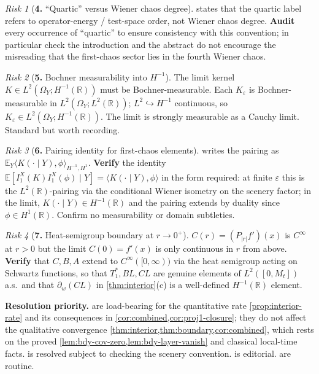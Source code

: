 \documentclass[11pt,reqno]{amsart}
\theoremstyle{plain}
\theoremstyle{definition}
\theoremstyle{remark}
\newtheorem*{risk}{Risk}
\newcommand{\R}{\mathbb{R}}
\newcommand{\E}{\mathbb{E}}
\begin{document}
\begin{risk}[\textbf{4.} ``Quartic'' versus Wiener chaos degree]
\label{rsk:quartic-label}
 states that the quartic label refers
to operator-energy / test-space order, not Wiener chaos degree.
\textbf{Audit} every occurrence of ``quartic'' to ensure consistency
with this convention; in particular check the introduction and the
abstract do not encourage the misreading that the first-chaos
sector lies in the fourth Wiener chaos.
\end{risk}

\begin{risk}[\textbf{5.} Bochner measurability into
\texorpdfstring{$H^{-1}$}{H\textasciicircum-1}]
\label{rsk:bochner}
The limit kernel $K\in L^{2}(\Omega_{Y};H^{-1}(\R))$ must be
Bochner-measurable. Each $K_{\varepsilon}$ is Bochner-measurable in
$L^{2}(\Omega_{Y};L^{2}(\R))$; $L^{2}\hookrightarrow H^{-1}$
continuous, so $K_{\varepsilon}\in L^{2}(\Omega_{Y};H^{-1}(\R))$.
The limit is strongly measurable as a Cauchy limit. Standard but
worth recording.
\end{risk}

\begin{risk}[\textbf{6.} Pairing identity for first-chaos elements]
\label{rsk:pairing}
 writes the pairing as
$\E_{Y}\langle K(\cdot\mid Y),\phi\rangle_{H^{-1},H^{1}}$.
\textbf{Verify} the identity
$\E[I_{1}^{X}(K)I_{1}^{X}(\phi)\mid Y]=\langle K(\cdot\mid Y),\phi\rangle$
in the form required: at finite $\varepsilon$ this is the
$L^{2}(\R)$-pairing via the conditional Wiener isometry on the
scenery factor; in the limit, $K(\cdot\mid Y)\in H^{-1}(\R)$ and the
pairing extends by duality since $\phi\in H^{1}(\R)$. Confirm no
measurability or domain subtleties.
\end{risk}

\begin{risk}[\textbf{7.} Heat-semigroup boundary at
\texorpdfstring{$r\to 0^{+}$}{r->0+}]
\label{rsk:heat-bdy}
$C(r)=(P_{|r|}f')(x)$ is $C^{\infty}$ at $r>0$ but the limit
$C(0)=f'(x)$ is only continuous in $r$ from above. \textbf{Verify}
that $C,B,A$ extend to $C^{\infty}([0,\infty))$ via the heat
semigroup acting on Schwartz functions, so that $T_{1}^{*},BL,CL$
are genuine elements of $L^{2}([0,M_{t}])$ a.s.\ and that
$\partial_{w}(CL)$ in \cref{thm:interior}(c) is a well-defined
$H^{-1}(\R)$ element.
\end{risk}

\smallskip
\noindent\textbf{Resolution priority.}
 are
load-bearing for the quantitative rate
\cref{prop:interior-rate} and its consequences in
\cref{cor:combined,cor:proj1-closure}; they do not affect the
qualitative convergence
\cref{thm:interior,thm:boundary,cor:combined}, which rests on the
proved \cref{lem:bdy-cov-zero,lem:bdy-layer-vanish} and classical
local-time facts.  is resolved subject to
checking the scenery convention.  is
editorial.  are routine.
\end{document}
